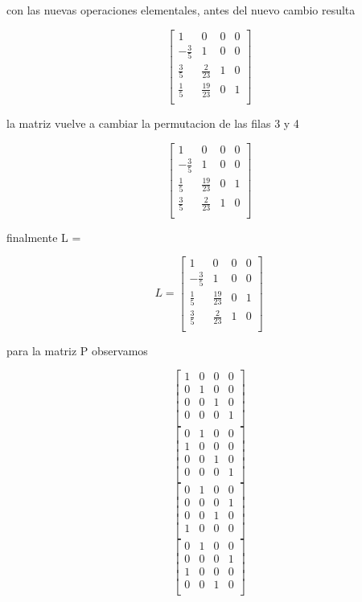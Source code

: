 \documentclass{article}
\begin{document}
con las nuevas operaciones elementales, antes del nuevo cambio resulta


\[
\begin{bmatrix}
        1 & 0 & 0 & 0   \\
        -\frac{3}{5} & 1 & 0 & 0   \\
        \frac{3}{5} &  \frac{2}{23}  & 1 & 0   \\
        \frac{1}{5} &  \frac{19}{23} & 0 & 1  \\
    \end{bmatrix}
\]

la matriz vuelve a cambiar la permutacion de las filas 3 y 4

\[
\begin{bmatrix}
        1 & 0 & 0 & 0   \\
        -\frac{3}{5} & 1 & 0 & 0   \\
        \frac{1}{5} &  \frac{19}{23} & 0 & 1  \\
        \frac{3}{5} &  \frac{2}{23}  & 1 & 0   \\
    \end{bmatrix}
\]

finalmente L = 

\[
L =
\begin{bmatrix}
        1 & 0 & 0 & 0   \\
        -\frac{3}{5} & 1 & 0 & 0   \\
        \frac{1}{5} &  \frac{19}{23} & 0 & 1  \\
        \frac{3}{5} &  \frac{2}{23}  & 1 & 0   \\
    \end{bmatrix}
\]

para la matriz P observamos

\[
\begin{bmatrix}
    1 & 0 & 0 & 0 \\
    0 & 1 & 0 & 0 \\
    0 & 0 & 1 & 0 \\
    0 & 0 & 0 & 1 \\
    \end{bmatrix}
\]
\[
\begin{bmatrix}
    0 & 1 & 0 & 0 \\
    1 & 0 & 0 & 0 \\
    0 & 0 & 1 & 0 \\
    0 & 0 & 0 & 1 \\
    \end{bmatrix}
\]
\[
\begin{bmatrix}
    0 & 1 & 0 & 0 \\
    0 & 0 & 0 & 1 \\
    0 & 0 & 1 & 0 \\
    1 & 0 & 0 & 0 \\
    \end{bmatrix}
\]
\[
\begin{bmatrix}
    0 & 1 & 0 & 0 \\
    0 & 0 & 0 & 1 \\
    1 & 0 & 0 & 0 \\
    0 & 0 & 1 & 0 \\
    \end{bmatrix}
\]
\end{document}
